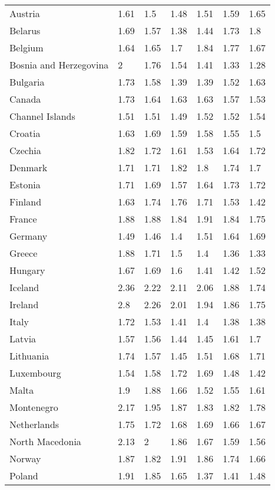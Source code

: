 \begin{longtable}[t]{lllllll}
Austria & 1.61 & 1.5 & 1.48 & 1.51 & 1.59 & 1.65\\
Belarus & 1.69 & 1.57 & 1.38 & 1.44 & 1.73 & 1.8\\
Belgium & 1.64 & 1.65 & 1.7 & 1.84 & 1.77 & 1.67\\
Bosnia and Herzegovina & 2 & 1.76 & 1.54 & 1.41 & 1.33 & 1.28\\
Bulgaria & 1.73 & 1.58 & 1.39 & 1.39 & 1.52 & 1.63\\
\addlinespace
Canada & 1.73 & 1.64 & 1.63 & 1.63 & 1.57 & 1.53\\
Channel Islands & 1.51 & 1.51 & 1.49 & 1.52 & 1.52 & 1.54\\
Croatia & 1.63 & 1.69 & 1.59 & 1.58 & 1.55 & 1.5\\
Czechia & 1.82 & 1.72 & 1.61 & 1.53 & 1.64 & 1.72\\
Denmark & 1.71 & 1.71 & 1.82 & 1.8 & 1.74 & 1.7\\
\addlinespace
Estonia & 1.71 & 1.69 & 1.57 & 1.64 & 1.73 & 1.72\\
Finland & 1.63 & 1.74 & 1.76 & 1.71 & 1.53 & 1.42\\
France & 1.88 & 1.88 & 1.84 & 1.91 & 1.84 & 1.75\\
Germany & 1.49 & 1.46 & 1.4 & 1.51 & 1.64 & 1.69\\
Greece & 1.88 & 1.71 & 1.5 & 1.4 & 1.36 & 1.33\\
\addlinespace
Hungary & 1.67 & 1.69 & 1.6 & 1.41 & 1.42 & 1.52\\
Iceland & 2.36 & 2.22 & 2.11 & 2.06 & 1.88 & 1.74\\
Ireland & 2.8 & 2.26 & 2.01 & 1.94 & 1.86 & 1.75\\
Italy & 1.72 & 1.53 & 1.41 & 1.4 & 1.38 & 1.38\\
Latvia & 1.57 & 1.56 & 1.44 & 1.45 & 1.61 & 1.7\\
\addlinespace
Lithuania & 1.74 & 1.57 & 1.45 & 1.51 & 1.68 & 1.71\\
Luxembourg & 1.54 & 1.58 & 1.72 & 1.69 & 1.48 & 1.42\\
Malta & 1.9 & 1.88 & 1.66 & 1.52 & 1.55 & 1.61\\
Montenegro & 2.17 & 1.95 & 1.87 & 1.83 & 1.82 & 1.78\\
Netherlands & 1.75 & 1.72 & 1.68 & 1.69 & 1.66 & 1.67\\
\addlinespace
North Macedonia & 2.13 & 2 & 1.86 & 1.67 & 1.59 & 1.56\\
Norway & 1.87 & 1.82 & 1.91 & 1.86 & 1.74 & 1.66\\
Poland & 1.91 & 1.85 & 1.65 & 1.37 & 1.41 & 1.48\\

\end{longtable}
